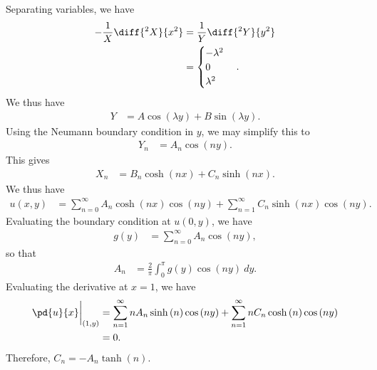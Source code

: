 \documentclass[10pt]{mypackage}
\begin{document}
\begin{solution}[12.5, Problem 6]
  Separating variables, we have 
  \begin{align*}
    -\frac{1}{X}\diff{^2X}{x^2} &= \frac{1}{Y}\diff{^2Y}{y^2}\\
                               &= \begin{cases}
                                 -\lambda^2\\
                                 0\\
                                 \lambda^2
                               \end{cases}.
  \end{align*}
  We thus have
  \begin{align*}
    Y &= A\cos\left( \lambda y \right) + B\sin\left( \lambda y \right).
  \end{align*}
  Using the Neumann boundary condition in $y$, we may simplify this to
  \begin{align*}
    Y_n &= A_n\cos\left( ny \right).
  \end{align*}
  This gives
  \begin{align*}
    X_n &= B_n\cosh\left( nx \right) + C_n\sinh\left( nx \right).
  \end{align*}
  We thus have
  \begin{align*}
    u\left( x,y \right) &= \sum_{n=0}^{\infty}A_n\cosh\left( nx \right)\cos\left( ny \right) + \sum_{n=1}^{\infty}C_n\sinh\left( nx \right)\cos\left( ny \right).
  \end{align*}
  Evaluating the boundary condition at $u\left( 0,y \right)$, we have
  \begin{align*}
    g(y) &= \sum_{n=0}^{\infty}A_n\cos\left( ny \right),
  \end{align*}
  so that
  \begin{align*}
    A_n &= \frac{2}{\pi} \int_{0}^{\pi} g(y)\cos\left( ny \right)\:dy.
  \end{align*}
  Evaluating the derivative at $x = 1$, we have
  \begin{align*}
    \pd{u}{x}\biggr\vert_{(1,y)} &= \sum_{n=1}^{\infty}nA_n\sinh\left( n \right)\cos\left( ny \right) + \sum_{n=1}^{\infty}nC_n\cosh\left( n \right)\cos\left( ny \right)\\
                                 &= 0.
  \end{align*}
  Therefore, $C_n = -A_n\tanh\left( n \right)$.
\end{solution}
\end{document}
